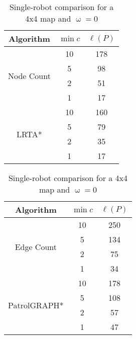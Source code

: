 \begin{table}[H]
\centering
\begin{tabular}{@{}ccc@{}}
\toprule
Algorithm                                    & $\min c$  & $\ell(P)$           \\ \midrule
\multirow{4}{*}{Node Count} &   10        &   178             \\
                                         &   5          &     98             \\
                                         &  2           &    51              \\
                                         &  1           &    17              \\ \midrule
\multirow{4}{*}{LRTA*}     &  10          &   160             \\
                                        &   5           &   79                \\
                                        &   2           &   35                \\
                                        &   1           &   17                 \\ \bottomrule
\end{tabular}
\qquad \qquad%
\begin{tabular}{@{}ccc@{}}
\toprule
Algorithm                               & $\min c$  & $\ell(P)$           \\ \midrule
\multirow{4}{*}{Edge Count} &   10      &   250              \\
                                         &   5          &     134            \\
                                         &   2          &    75               \\
                                         &   1          &   34                \\ \midrule
\multirow{4}{*}{PatrolGRAPH*}&   10   &    178            \\
                                        &   5          &   108               \\
                                        &   2          &   57                 \\
                                        &   1          &   47                 \\ \bottomrule
\end{tabular}
\caption{Single-robot comparison for a 4x4 map and $\upomega=0$}
\label{tab:singleRobResults}
\end{table}

